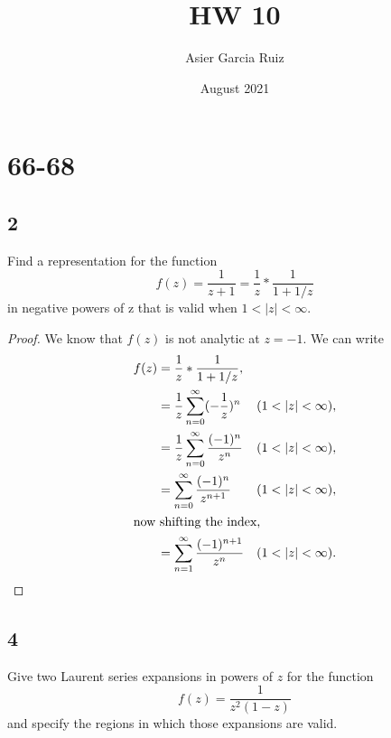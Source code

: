 \documentclass{article}
\title{HW 10}
\author{Asier Garcia Ruiz }
\date{August 2021}
\begin{document}
\maketitle

\section*{66-68}
\subsection*{2}
Find a representation for the function
\[f(z)=\frac{1}{z + 1}= \frac{1}{z}*\frac{1}{1+1/z}\]
in negative powers of z that is valid when $1 < |z| < \infty$.

\begin{proof}
    We know that $f(z)$ is not analytic at $z=-1$. We can write
    \begin{align*}
        f(z) & = \frac{1}{z}*\frac{1}{1+1/z},                                       \\
             & = \frac{1}{z} \sum_{n=0}^\infty (-\frac{1}{z})^n   & (1<|z|<\infty), \\
             & = \frac{1}{z} \sum_{n=0}^\infty \frac{(-1)^n}{z^n} & (1<|z|<\infty), \\
             & = \sum_{n=0}^\infty \frac{(-1)^{n}}{z^{n+1}}       & (1<|z|<\infty), \\
        \intertext{now shifting the index,}
             & = \sum_{n=1}^\infty \frac{(-1)^{n+1}}{z^n}         & (1<|z|<\infty). \\
    \end{align*}
\end{proof}

\subsection*{4}
Give two Laurent series expansions in powers of $z$ for the function
\[f(z) = \frac{1}{z^2(1-z)}\]
and specify the regions in which those expansions are valid.
\end{document}
